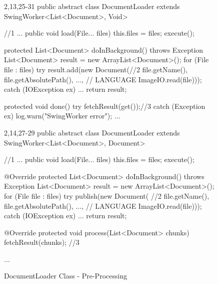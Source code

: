 \begin{figure}[H]
\begin{minipage}{0.48\textwidth}
\begin{sourcecode}
\begin{javacode}{2,13,25-31}
public abstract class DocumentLoader 
	extends SwingWorker<List<Document>, Void> { //1$\label{codeline:DocumentLoader-1a}$
    ...
    public void load(File... files) {
        this.files = files;
        execute();
    }
    
    protected List<Document> doInBackground() throws Exception {
        List<Document> result = new ArrayList<Document>();
        for (File file : files) {
            try {
                result.add(new Document(//2$\label{codeline:DocumentLoader-2a}$
                        file.getName(),
                        file.getAbsolutePath(),
                        ..., // LANGUAGE
                        ImageIO.read(file)));
            } catch (IOException ex) {
                ...
            }
        }
        return result;
    }

    protected void done() {
        try {
            fetchResult(get());//3$\label{codeline:DocumentLoader-3a}$
        } catch (Exception ex) {
            log.warn("SwingWorker error");
        }
    }
    ...
}
\end{javacode}
\caption{DocumentLoader Class - Original Code}
\label{code:example-original-v1}
\end{sourcecode}
\end{minipage}\hspace{0.7cm}
\begin{minipage}{0.48\textwidth}
\begin{sourcecode}
\begin{javacode}{2,14,27-29}
public abstract class DocumentLoader 
	extends SwingWorker<List<Document>, Document> { //1$\label{codeline:DocumentLoader-1b}$
	...
    public void load(File... files) {
        this.files = files;
        execute();
    }
    
    @Override
    protected List<Document> doInBackground() throws Exception {
        List<Document> result = new ArrayList<Document>();
        for (File file : files) {
            try {
                publish(new Document( //2$\label{codeline:DocumentLoader-2b}$
                        file.getName(),
                        file.getAbsolutePath(),
                        ..., // LANGUAGE
                        ImageIO.read(file)));
            } catch (IOException ex) {
                ...
            }
        }
        return result;
    }

    @Override
    protected void process(List<Document> chunks){
        fetchResult(chunks); //3$\label{codeline:DocumentLoader-3b}$
    }

    ...
}
\end{javacode}
\caption{DocumentLoader Class - Pre-Processing}
\label{code:example-pre-processing}
\end{sourcecode}
\end{minipage}
\end{figure}